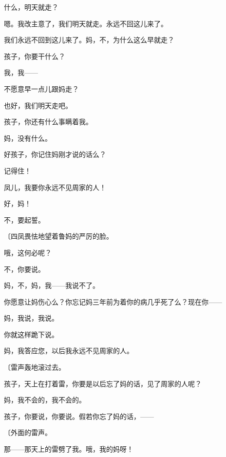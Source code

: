 什么，明天就走？

嗯。我改主意了，我们明天就走。永远不回这儿来了。

我们永远不回到这儿来了。妈，不，为什么这么早就走？

孩子，你要干什么？

我，我——

不愿意早一点儿跟妈走？

也好，我们明天走吧。

孩子，你还有什么事瞒着我。

妈，没有什么。

好孩子，你记住妈刚才说的话么？

记得住！

凤儿，我要你永远不见周家的人！

好，妈！

不，要起誓。

{\fangsong〔四凤畏怯地望着鲁妈的严厉的脸。}

哦，这何必呢？

不，你要说。

妈，不，妈，我——我说不了。

你愿意让妈伤心么？你忘记妈三年前为着你的病几乎死了么？现在你——

妈，我说，我说。

你就这样跪下说。

妈，我答应您，以后我永远不见周家的人。

{\fangsong〔雷声轰地滚过去。}

孩子，天上在打着雷，你要是以后忘了妈的话，见了周家的人呢？

妈，我不会的，我不会的。

孩子，你要说，你要说。假若你忘了妈的话，——

{\fangsong〔外面的雷声。}

那——那天上的雷劈了我。哦，我的妈呀！

